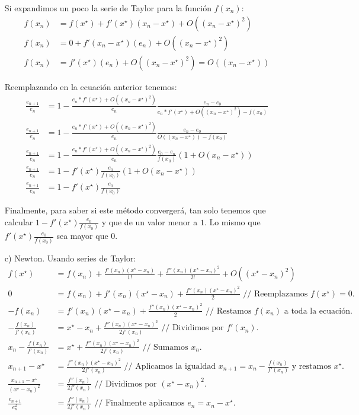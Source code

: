 \documentclass[spanish, fleqn]{article}
\newcommand{\xstar}{x^\star}
\begin{document}
\begin{enumerate}
    Si expandimos un poco la serie de Taylor para la función $f(x_n)$:
    \begin{align*}
        f(x_n) &= f(\xstar) + f'(\xstar)(x_n - \xstar) + O((x_n - \xstar)^2) \\ 
        f(x_n) &= 0 + f'(x_n - \xstar)(e_n) + O((x_n - \xstar)^2) \\ 
        f(x_n) &= f'(\xstar)(e_n) + O((x_n - \xstar)^2) = O((x_n - \xstar))
    \end{align*}
    
    Reemplazando en la ecuación anterior tenemos:
    \begin{align*}
        \frac{e_{n+1}}{e_n} &= 1 - \frac{e_n * f'(\xstar)  + O((x_n - \xstar)^2)}{e_n}\frac{e_n - e_0}{e_n*f'(\xstar) + O((x_n - \xstar)^2) - f(x_0)} \\
        \frac{e_{n+1}}{e_n} &= 1 - \frac{e_n * f'(\xstar)  + O((x_n - \xstar)^2)}{e_n}\frac{e_n - e_0}{ O((x_n - \xstar)) - f(x_0)} \\
        \frac{e_{n+1}}{e_n} &= 1 - \frac{e_n * f'(\xstar)  + O((x_n - \xstar)^2)}{e_n}\frac{e_0 - e_n}{f(x_0)}(1 + O(x_n - \xstar)) \\
        \frac{e_{n+1}}{e_n} &= 1 - f'(\xstar)  \frac{e_0}{f(x_0)}(1 + O(x_n - \xstar)) \\
        \frac{e_{n+1}}{e_n} &= 1 - f'(\xstar) \frac{e_0}{f(x_0)}
    \end{align*}
    
    Finalmente, para saber si este método convergerá, tan solo tenemos que calcular $1 - f'(\xstar) \frac{e_0}{f(x_0)}$ y que de un valor menor a $1$. Lo mismo que $f'(\xstar) \frac{e_0}{f(x_0)}$ sea mayor que $0$.
    
    \item[c)] Newton.
    Usando series de Taylor:
    \begin{align*}
        f(x^\star) &= f(x_n) + \frac{f'(x_n)(x^\star - x_n)}{1!} + \frac{f''(x_n)(x^\star - x_n)^2}{2!} + O((x^\star - x_n)^2) \\ 
        0 &= f(x_n) + f'(x_n)(x^\star - x_n) + \frac{f''(x_n)(x^\star - x_n)^2}{2} \text{ // Reemplazamos $f(x^\star) = 0$.} \\ 
        -f(x_n) &= f'(x_n)(x^\star - x_n) + \frac{f''(x_n)(x^\star - x_n)^2}{2} \text{ // Restamos $f(x_n)$ a toda la ecuación. } \\ 
        -\frac{f(x_n)}{f'(x_n)} &= x^\star - x_n + \frac{f''(x_n)(x^\star - x_n)^2}{2f'(x_n)} \text{ // Dividimos por $f'(x_n)$. } \\ 
        x_n -\frac{f(x_n)}{f'(x_n)} &= x^\star + \frac{f''(x_n)(x^\star - x_n)^2}{2f'(x_n)} \text{ // Sumamos $x_n$. } \\ 
        x_{n+1} - x^\star &= \frac{f''(x_n)(x^\star - x_n)^2}{2f'(x_n)} \text{ // Aplicamos la igualdad $x_{n+1} = x_n -\frac{f(x_n)}{f'(x_n)}$ y restamos $x^\star$. } \\ 
        \frac{x_{n+1} - x^\star}{(x^\star - x_n)^2} &= \frac{f''(x_n)}{2f'(x_n)} \text{ // Dividimos por $(x^\star - x_n)^2$. } \\ 
        \frac{e_{n+1}}{e_n^2} &= \frac{f''(x_n)}{2f'(x_n)} \text{ // Finalmente aplicamos $e_n = x_n - x^\star$. }
    \end{align*}
    

\end{enumerate}
\end{document}
